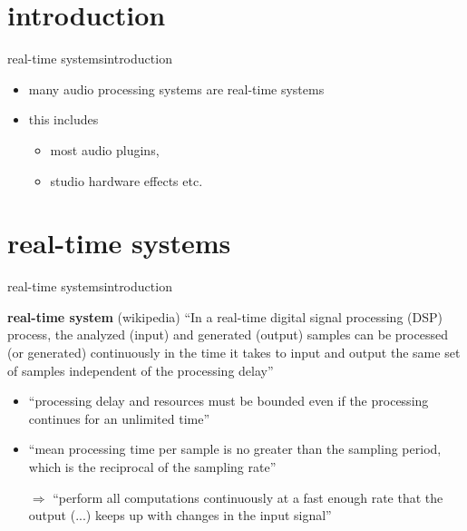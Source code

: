 



\subtitle{Part 17: real-time and blocking}


	

\section[intro]{introduction}
	\begin{frame}{real-time systems}{introduction}
        \begin{itemize}
            \item   many audio processing systems are real-time systems
            \item   this includes 
                \begin{itemize}
                    \item   most audio plugins, 
                    \item   studio hardware effects etc.
                \end{itemize}
        \end{itemize}
	\end{frame}

        \section{real-time systems}
	\begin{frame}{real-time systems}{introduction}
		\begin{block}{\textbf{real-time system} (wikipedia)}
            ``In a real-time digital signal processing (DSP) process, the analyzed (input) and generated (output) samples can be processed (or generated) continuously in the time it takes to input and output the same set of samples independent of the processing delay''
			
		\end{block}
        \pause
        \begin{itemize}
            \item   ``processing delay and resources must be bounded even if the processing continues for an unlimited time''
            \pause  
            \item   ``mean processing time per sample is no greater than the sampling period, which is the reciprocal of the sampling rate''
            \pause
            \item[$\Rightarrow$] ``perform all computations continuously at a fast enough rate that the output (...) keeps up with changes in the input signal'' 
        \end{itemize}
        
	\end{frame}


